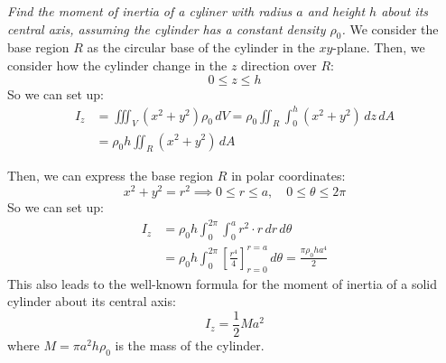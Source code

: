 \documentclass[11pt]{report}
\begin{document}
\begin{example}
    \textit{Find the moment of inertia of a cyliner with radius $a$ and height $h$ about its central axis, assuming the cylinder has a constant density $\rho_0$.}
    We consider the base region $R$ as the circular base of the cylinder in the $xy$-plane. Then, we consider how the cylinder change in the $z$ direction over $R$:
    $$
        0 \le z \le h
    $$
    So we can set up:
    \begin{align*}
        I_z &= \iiint_V (x^2 + y^2) \rho_0 \, dV = \rho_0 \iint_R \int_0^h (x^2 + y^2) \, dz \, dA \\
        &= \rho_0 h \iint_R (x^2 + y^2) \, dA
    \end{align*}

    Then, we can express the base region $R$ in polar coordinates:
    $$        
    x^2 + y^2 = r^2 \implies 0 \le r \le a, \quad 0 \le \theta \le 2\pi
    $$
    So we can set up:
    \begin{align*}
        I_z &= \rho_0 h \int_0^{2\pi} \int_0^a r^2 \cdot r \, dr \, d\theta \\
        &= \rho_0 h \int_0^{2\pi} \left[ \frac{r^4}{4} \right]_{r=0}^{r=a} \, d\theta = \frac{\pi \rho_0 h a^4}{2}
    \end{align*}
    This also leads to the well-known formula for the moment of inertia of a solid cylinder about its central axis:
    $$
        I_z = \frac{1}{2} M a^2
    $$
    where $M = \pi a^2 h \rho_0$ is the mass of the cylinder. 
\end{example}
\end{document}
